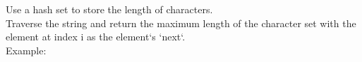 \documentclass[preview]{standalone}
\begin{document}
Use a hash set to store the length of characters.\\Traverse the string and return the maximum length of the character set with the element at index i as the element`s `next`.\\Example:\\
\end{document}
